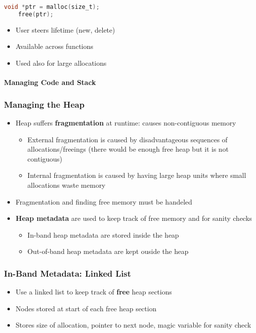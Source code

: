 \begin{lstlisting}[language={C}]
    void *ptr = malloc(size_t);
    free(ptr);                  
\end{lstlisting}
\begin{itemize}
    \item User steers lifetime (new, delete)
    \item Available across functions
    \item Used also for large allocations
\end{itemize}

\paragraph{Managing Code and Stack}



\subsubsection{Managing the Heap}
\begin{itemize}
    \item Heap suffers \textbf{fragmentation} at runtime: causes non-contiguous memory
          \noindent\begin{itemize}
              \item External fragmentation is caused by disadvantageous sequences of allocations/freeings (there would be enough free heap but it is not contiguous)
              \item Internal fragmentation is caused by having large heap units where small allocations waste memory
          \end{itemize}
    \item Fragmentation and finding free memory must be handeled
    \item \textbf{Heap metadata} are used to keep track of free memory and for sanity checks
          \noindent\begin{itemize}
              \item In-band heap metadata are stored inside the heap
              \item Out-of-band heap metadata are kept ouside the heap
          \end{itemize}
\end{itemize}

\subsubsection{In-Band Metadata: Linked List}
\begin{itemize}
    \item Use a linked list to keep track of \textbf{free} heap sections
    \item Nodes stored at start of each free heap section
    \item Stores size of allocation, pointer to next node, magic variable for sanity check
\end{itemize}

